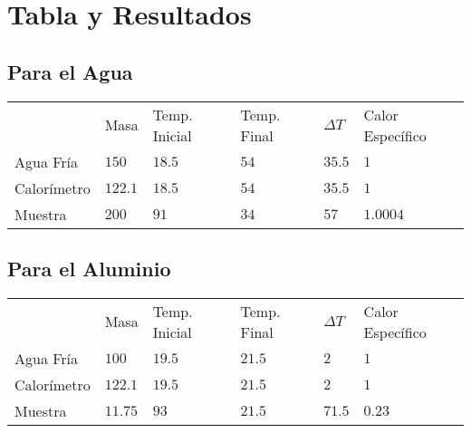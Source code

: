 \section{Tabla y Resultados}
\subsection{Para el Agua}
\begin{table}[H]%
	\centering
	\begin{tabular}{L{2cm}C{1.5cm}C{2.2cm}C{2cm}C{1.3cm}C{2.5cm}}
		 & Masa    & Temp. Inicial & Temp. Final & $\Delta T$ & Calor Específico \\
		Agua Fría          & $150$   & $18.5$        & $54$        & $35.5$     & $1$              \\
		Calorímetro        & $122.1$ & $18.5$        & $54$        & $35.5$     & $1$              \\
		Muestra            & $200$   & $91$          & $34$        & $57$       & $1.0004$         \\
	\end{tabular}
\end{table}
\subsection{Para el Aluminio}
\begin{table}[H]%
	\centering
	\begin{tabular}{L{2cm}C{1.5cm}C{2.2cm}C{2cm}C{1.3cm}C{2.5cm}}
		 & Masa    & Temp. Inicial & Temp. Final & $\Delta T$ & Calor Específico \\
		Agua Fría          & $100$   & $19.5$        & $21.5$      & $2$        & $1$              \\
		Calorímetro        & $122.1$ & $19.5$        & $21.5$      & $2$        & $1$              \\
		Muestra            & $11.75$ & $93$          & $21.5$      & $71.5$     & $0.23$           \\
	\end{tabular}
\end{table}

